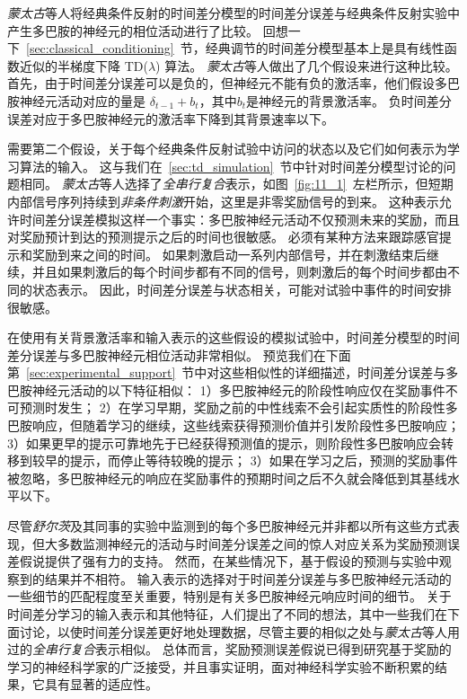 \textit{蒙太古}\cite{montague1996framework}等人将经典条件反射的时间差分模型的时间差分误差与经典条件反射实验中产生多巴胺的神经元的相位活动进行了比较。
回想一下~\ref{sec:classical_conditioning}~节，经典调节的时间差分模型基本上是具有线性函数近似的半梯度下降 TD($ \lambda $) 算法。
\textit{蒙太古}等人做出了几个假设来进行这种比较。
首先，由于时间差分误差可以是负的，但神经元不能有负的激活率，他们假设多巴胺神经元活动对应的量是 $ \delta_{t-1} + b_t $，其中$ b_t $是神经元的背景激活率。
负时间差分误差对应于多巴胺神经元的激活率下降到其背景速率以下。



需要第二个假设，关于每个经典条件反射试验中访问的状态以及它们如何表示为学习算法的输入。
这与我们在~\ref{sec:td_simulation}~节中针对时间差分模型讨论的问题相同。 
\textit{蒙太古}等人选择了\textit{全串行复合}表示，如图~\ref{fig:11_1}~左栏所示，但短期内部信号序列持续到\textit{非条件刺激}开始，这里是非零奖励信号的到来。
这种表示允许时间差分误差模拟这样一个事实：多巴胺神经元活动不仅预测未来的奖励，而且对奖励预计到达的预测提示之后的时间也很敏感。
必须有某种方法来跟踪感官提示和奖励到来之间的时间。
如果刺激启动一系列内部信号，并在刺激结束后继续，并且如果刺激后的每个时间步都有不同的信号，则刺激后的每个时间步都由不同的状态表示。
因此，时间差分误差与状态相关，可能对试验中事件的时间安排很敏感。


在使用有关背景激活率和输入表示的这些假设的模拟试验中，时间差分模型的时间差分误差与多巴胺神经元相位活动非常相似。
预览我们在下面第~\ref{sec:experimental_support}~节中对这些相似性的详细描述，时间差分误差与多巴胺神经元活动的以下特征相似：
1）多巴胺神经元的阶段性响应仅在奖励事件不可预测时发生；
2）在学习早期，奖励之前的中性线索不会引起实质性的阶段性多巴胺响应，但随着学习的继续，这些线索获得预测价值并引发阶段性多巴胺响应；
3）如果更早的提示可靠地先于已经获得预测值的提示，则阶段性多巴胺响应会转移到较早的提示，而停止等待较晚的提示；
3）如果在学习之后，预测的奖励事件被忽略，多巴胺神经元的响应在奖励事件的预期时间之后不久就会降低到其基线水平以下。


尽管\textit{舒尔茨}及其同事的实验中监测到的每个多巴胺神经元并非都以所有这些方式表现，但大多数监测神经元的活动与时间差分误差之间的惊人对应关系为奖励预测误差假说提供了强有力的支持。
然而，在某些情况下，基于假设的预测与实验中观察到的结果并不相符。
输入表示的选择对于时间差分误差与多巴胺神经元活动的一些细节的匹配程度至关重要，特别是有关多巴胺神经元响应时间的细节。
关于时间差分学习的输入表示和其他特征，人们提出了不同的想法，其中一些我们在下面讨论，以使时间差分误差更好地处理数据，尽管主要的相似之处与\textit{蒙太古}等人用过的\textit{全串行复合}表示相似。
总体而言，奖励预测误差假说已得到研究基于奖励的学习的神经科学家的广泛接受，并且事实证明，面对神经科学实验不断积累的结果，它具有显著的适应性。


